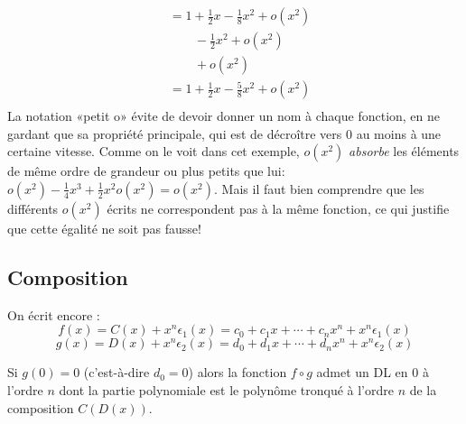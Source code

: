 \documentclass[class=report,crop=false]{standalone}
\begin{document}
\begin{exemple}
\begin{align*}
  & = 1+\frac{1}{2}x-\frac{1}{8}x^2+o(x^2)\\
  &  \qquad -\frac{1}{2}x^2 + o(x^2) \\
  &  \qquad + o(x^2) \\
  & = 1+\frac{1}{2}x-\frac{5}{8}x^2+o(x^2) \\
\end{align*}
La notation «petit o» évite de devoir donner un nom à chaque fonction, en ne gardant que
sa propriété principale, qui est de décroître vers $0$ au moins à une certaine vitesse.
Comme on le voit dans cet exemple, $o(x^2)$ \emph{absorbe} les éléments de même ordre de grandeur
ou plus petits que lui: $o(x^2)-\frac{1}{4}x^3 + \frac{1}{2} x^2 o(x^2) = o(x^2)$.
Mais il faut bien comprendre que les différents $o(x^2)$ écrits ne correspondent pas à la même fonction,
ce qui justifie que cette égalité ne soit pas fausse!
\end{exemple}



\subsection{Composition}

On écrit encore :
$$f(x) = C(x) + x^n\epsilon_1(x)=c_0+c_1x + \cdots +c_nx^n + x^n\epsilon_1(x)$$
$$g(x) = D(x) + x^n\epsilon_2(x)=d_0+d_1x + \cdots +d_nx^n + x^n\epsilon_2(x)$$
\begin{proposition}
Si $g(0)=0$ (c'est-à-dire $d_0=0$) alors la fonction $f\circ g$ admet un DL en $0$ à l'ordre $n$
dont la partie polynomiale est
le polynôme tronqué à l'ordre $n$ de la composition $C(D(x))$.
\end{proposition}
\end{document}
